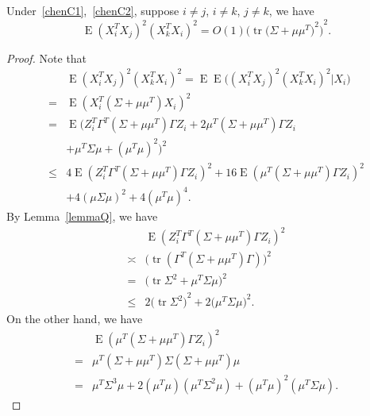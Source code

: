 \documentclass[smallcondensed,final,natbib]{svjour3}          %
\DeclareMathOperator{\mytr}{tr}
\DeclareMathOperator{\myE}{E}
\begin{document}
\begin{lemma}\label{smallLemma2}
    Under~\eqref{chenC1},~\eqref{chenC2}, suppose $i\neq j$, $i\neq k$, $j\neq k$, we have
    \begin{equation}\label{eq:2}
            \myE{(X_i^T X_j)}^2{(X_k^T X_i)}^2=
             O(1){\Big(\mytr {\big(\Sigma+\mu\mu^T\big)}^2\Big)}^2.
    \end{equation}
\end{lemma}
\begin{proof}
Note that
    \begin{equation*}
        \begin{aligned}
            &\myE{(X_i^T X_j)}^2{(X_k^T X_i)}^2
            = 
            \myE\myE\big({(X_i^T X_j)}^2{(X_k^T X_i)}^2| X_i\big)\\
            =&
            \myE{(X_i^T (\Sigma+\mu\mu^T) X_i )}^2\\
            =&
            \myE\Big(Z_i^T \Gamma^T (\Sigma+\mu\mu^T) \Gamma Z_i+ 2\mu^T (\Sigma+\mu\mu^T)\Gamma Z_i \\
            &+\mu^T \Sigma \mu +(\mu^T\mu)^2 \Big)^2\\
            \leq&
            4\myE(Z_i^T \Gamma^T (\Sigma+\mu\mu^T) \Gamma Z_i)^2+ 16\myE(\mu^T (\Sigma+\mu\mu^T)\Gamma Z_i)^2 \\
            &+4(\mu \Sigma \mu)^2 +4(\mu^T\mu)^4.
        \end{aligned}
    \end{equation*}
    By Lemma~\eqref{lemmaQ}, we have
    \begin{equation*}
        \begin{aligned}
            &\myE(Z_i^T \Gamma^T (\Sigma+\mu\mu^T) \Gamma Z_i)^2\\
            \asymp&
\big(\mytr (\Gamma^T (\Sigma+\mu\mu^T)\Gamma)\big)^2\\
            =&
\big(\mytr \Sigma^2+\mu^T\Sigma \mu\big)^2\\
            \leq&
            2{\big(\mytr \Sigma^2\big)}^2+2{\big(\mu^T\Sigma \mu\big)}^2.
        \end{aligned}
    \end{equation*}
    On the other hand, we have
    \begin{equation*}
        \begin{aligned}
            &\myE(\mu^T (\Sigma+\mu\mu^T)\Gamma Z_i)^2\\
            =&
\mu^T (\Sigma+\mu\mu^T)\Sigma (\Sigma+\mu\mu^T)\mu\\
            =&\mu^T \Sigma^3 \mu+2(\mu^T\mu)(\mu^T\Sigma^2\mu)+{(\mu^T\mu)}^2(\mu^T\Sigma\mu).

\end{aligned}
\end{equation*}
\end{proof}
\end{document}
